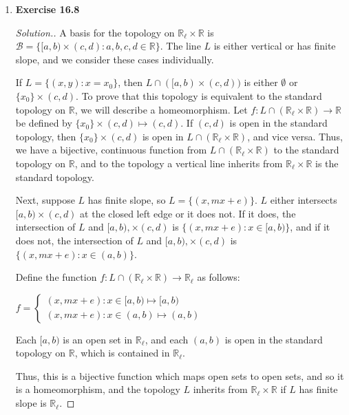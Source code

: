 \documentclass{article}
\newcommand{\R}{\mathbb{R}}
\newcommand{\B}{\mathcal{B}}
\newcommand{\sk}{\smallskip}
\begin{document}
\begin{enumerate}
    \item 
    \textbf{Exercise 16.8}
    \begin{proof}[Solution.]
        A basis for the topology on $\R_\ell \times \R$ is $\B = \{[a, b) \times (c, d) : a, b, c, d \in \R\}$. The line $L$ is either vertical or has finite slope, and we consider these cases individually. 

        \sk 

        If $L = \{(x, y) : x = x_0\}$, then $L \cap ([a, b) \times (c, d))$ is either $\emptyset$ or $\{x_0\} \times (c, d)$. To prove that this topology is equivalent to the standard topology on $\R$, we will describe a homeomorphism. Let $f: L \cap (\R_\ell \times \R) \rightarrow \R$ be defined by $\{x_0\} \times (c, d) \mapsto (c, d)$. If $(c, d)$ is open in the standard topology, then $\{x_0\} \times (c, d)$ is open in $L \cap (\R_\ell \times \R)$, and vice versa. Thus, we have a bijective, continuous function from $L \cap (\R_\ell \times \R)$ to the standard topology on $\R$, and to the topology a vertical line inherits from $\R_\ell \times \R$ is the standard topology. 

        \sk

        Next, suppose $L$ has finite slope, so $L = \{(x, mx + e)\}$. $L$ either intersects $[a, b) \times (c, d)$ at the closed left edge or it does not. If it does, the intersection of $L$ and $[a, b), \times (c, d)$ is $\{(x, mx+e) : x \in [a, b) \}$, and if it does not, the intersection of $L$ and $[a, b), \times (c, d)$ is $\{(x, mx+e) : x \in (a, b) \}$. 

        \sk

        Define the function $f: L \cap (\R_\ell \times \R) \rightarrow \R_\ell$ as follows:
        \begin{center}$f = 
            \begin{cases}
                (x, mx+e) : x \in [a, b) \mapsto [a, b) \\
                (x, mx+e) : x \in (a, b) \mapsto (a, b)
            \end{cases}$
        \end{center}

        Each $[a, b)$ is an open set in $\R_\ell$, and each $(a, b)$ is open in the standard topology on $\R$, which is contained in $\R_\ell$. 

        \sk

        Thus, this is a bijective function which maps open sets to open sets, and so it is a homeomorphism, and the topology $L$ inherits from $\R_\ell \times \R$ if $L$ has finite slope is $\R_\ell$.


\end{proof}
\end{enumerate}
\end{document}
